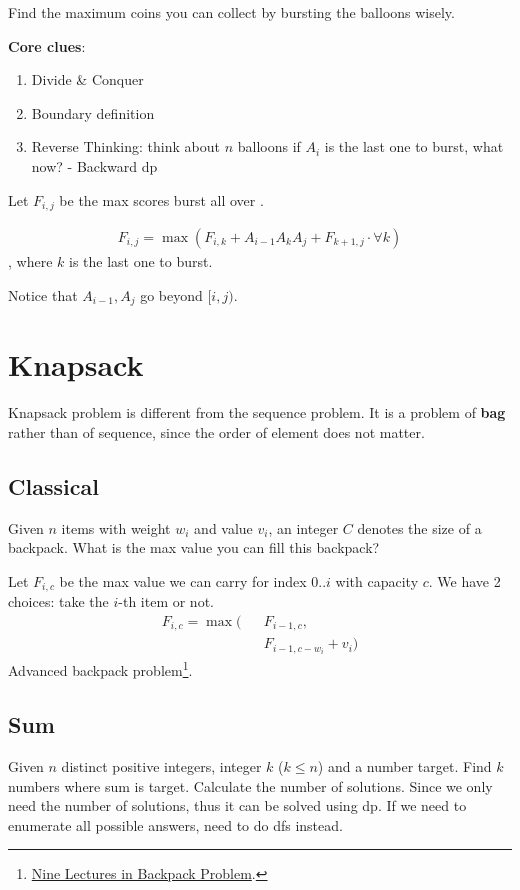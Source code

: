 {Find the maximum coins you can collect by bursting the balloons wisely.

\textbf{Core clues}:
\begin{enumerate}
\item Divide \& Conquer
\item Boundary definition
\item Reverse Thinking: think about $n$ balloons if $A_i$ is the last one to burst, what now? - Backward dp
\end{enumerate}
Let $F_{i, j}$ be the max scores burst all over .

\begin{align*}
F_{i, j} = \max(F_{i,k} + A_{i-1}  A_k A_j + F_{k+1, j} \cdot \forall k)
\end{align*}
, where $k$ is the last one to burst. 

Notice that $A_{i-1}, A_{j}$ go beyond $[i, j)$.

\section{Knapsack}
Knapsack problem is different from the sequence problem. It is a problem of \textbf{bag} rather than of sequence, since the order of element does not matter. 

\subsection{Classical}
Given $n$ items with weight $w_i$ and value $v_i$, an integer $C$ denotes the size of a backpack. What is the max value you can fill this backpack?

Let $F_{i, c}$ be the max value we can carry for index $0..i$ with capacity $c$. We have 2 choices: take the $i$-th item or not.
\begin{eqnarray*}
F_{i, c}= \max\big(&&F_{i-1, c}, \\
&&F_{i-1, c-w_i}+v_i\big)
\end{eqnarray*}
Advanced backpack problem\footnote{\href{http://github.com/tianyicui/pack}{Nine Lectures in Backpack Problem}.}. 

\subsection{Sum}
 Given $n$ distinct positive integers, integer $k$ ($k \leq n$) and a number target. Find $k$ numbers where sum is target. Calculate the number of solutions. Since we only need the number of solutions, thus it can be solved using dp. If we need to enumerate all possible answers, need to do dfs instead. 

}
